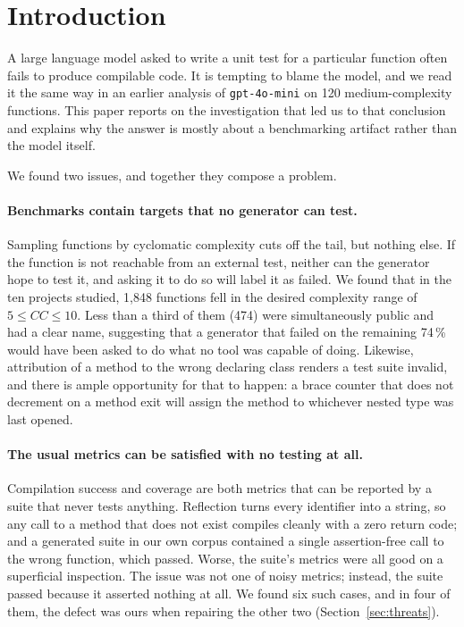 \section{Introduction}\label{sec:intro}

A large language model asked to write a unit test for a particular function often fails to
produce compilable code. It is tempting to blame the model, and we read it the same way in an
earlier analysis of \texttt{gpt-4o-mini} on 120 medium-complexity functions. This paper
reports on the investigation that led us to that conclusion and explains why the answer is
mostly about a benchmarking artifact rather than the model itself.

We found two issues, and together they compose a problem.

\paragraph{Benchmarks contain targets that no generator can test.}
Sampling functions by cyclomatic complexity cuts off the tail, but nothing else. If the
function is not reachable from an external test, neither can the generator hope to test it,
and asking it to do so will label it as failed. We found that in the ten projects studied,
1{,}848 functions fell in the desired complexity range of $5 \le CC \le 10$. Less than a
third of them (474) were simultaneously public and had a clear name, suggesting that a
generator that failed on the remaining 74\,\% would have been asked to do what no tool was
capable of doing. Likewise, attribution of a method to the wrong declaring class renders a
test suite invalid, and there is ample opportunity for that to happen: a brace counter that
does not decrement on a method exit will assign the method to whichever nested type was last
opened.

\paragraph{The usual metrics can be satisfied with no testing at all.}
Compilation success and coverage are both metrics that can be reported by a suite that never
tests anything. Reflection turns every identifier into a string, so any call to a method that
does not exist compiles cleanly with a zero return code; and a generated suite in our own
corpus contained a single assertion-free call to the wrong function, which passed. Worse, the
suite's metrics were all good on a superficial inspection. The issue was not one of noisy
metrics; instead, the suite passed because it asserted nothing at all. We found six such
cases, and in four of them, the defect was ours when repairing the other two
(Section~\ref{sec:threats}).


